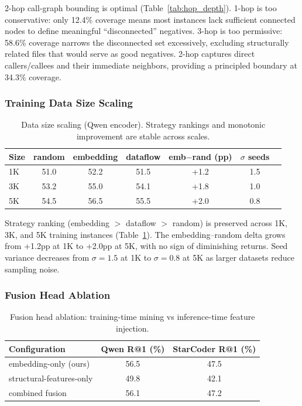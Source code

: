 \documentclass[11pt]{article}
\begin{document}
2-hop call-graph bounding is optimal (Table~\ref{tab:hop_depth}).
1-hop is too conservative: only 12.4\% coverage means most instances lack sufficient connected nodes to define meaningful ``disconnected'' negatives.
3-hop is too permissive: 58.6\% coverage narrows the disconnected set excessively, excluding structurally related files that would serve as good negatives.
2-hop captures direct callers/callees and their immediate neighbors, providing a principled boundary at 34.3\% coverage.

\subsubsection{Training Data Size Scaling}
\label{sec:data_scaling}

\begin{table}[h]
\centering
\caption{Data size scaling (Qwen encoder). Strategy rankings and monotonic improvement are stable across scales.}
\label{tab:data_scaling}
\begin{tabular}{lcccccc}
\toprule
\textbf{Size} & \textbf{random} & \textbf{embedding} & \textbf{dataflow} & \textbf{emb$-$rand (pp)} & $\sigma$ \textbf{seeds} \\
\midrule
1K & 51.0 & 52.2 & 51.5 & +1.2 & 1.5 \\
3K & 53.2 & 55.0 & 54.1 & +1.8 & 1.0 \\
5K & 54.5 & 56.5 & 55.5 & +2.0 & 0.8 \\
\bottomrule
\end{tabular}
\end{table}

Strategy ranking (embedding $>$ dataflow $>$ random) is preserved across 1K, 3K, and 5K training instances (Table~\ref{tab:data_scaling}).
The embedding--random delta grows from +1.2pp at 1K to +2.0pp at 5K, with no sign of diminishing returns.
Seed variance decreases from $\sigma = 1.5$ at 1K to $\sigma = 0.8$ at 5K as larger datasets reduce sampling noise.

\subsubsection{Fusion Head Ablation}
\label{sec:fusion_ablation}

\begin{table}[h]
\centering
\caption{Fusion head ablation: training-time mining vs inference-time feature injection.}
\label{tab:fusion}
\begin{tabular}{lcc}
\toprule
\textbf{Configuration} & \textbf{Qwen R@1 (\%)} & \textbf{StarCoder R@1 (\%)} \\
\midrule
embedding-only (ours) & 56.5 & 47.5 \\
structural-features-only & 49.8 & 42.1 \\
combined fusion & 56.1 & 47.2 \\
\bottomrule
\end{tabular}
\end{table}
\end{document}

